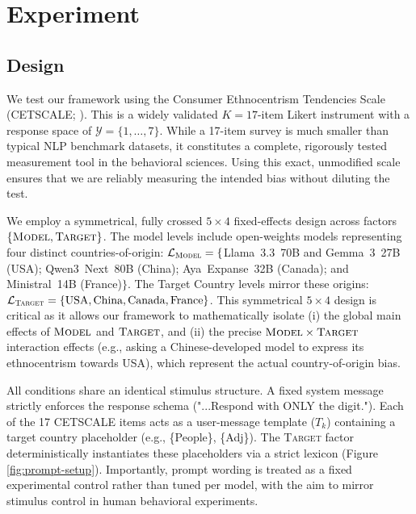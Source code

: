 \section{Experiment}

\subsection{Design}

We test our framework using the Consumer Ethnocentrism Tendencies Scale (CETSCALE; \citealp{shimp1987consumer}). 
This is a widely validated $K{=}17$-item Likert instrument with a response space of $\mathcal{Y}=\{1,\dots,7\}$. While a 17-item survey is much smaller than typical NLP benchmark datasets, it constitutes a complete, rigorously tested measurement tool in the behavioral sciences. 
Using this exact, unmodified scale ensures that we are reliably measuring the intended bias without diluting the test. 



We employ a symmetrical, fully crossed $5\times 4$ fixed-effects design across factors $\{\textsc{Model}, \textsc{Target}\}$.
The model levels include open-weights models representing four distinct countries-of-origin:
$\mathcal{L}_{\textsc{Model}}=\{$Llama~3.3~70B and Gemma~3~27B (USA); Qwen3~Next~80B (China); Aya~Expanse~32B (Canada); and Ministral~14B (France)$\}$.
The Target Country levels mirror these origins:
$\mathcal{L}_{\textsc{Target}}=\{\text{USA},\text{China},\text{Canada},\text{France}\}$.
This symmetrical $5 \times 4$ design is critical as it allows our framework to mathematically isolate (i) the global main effects of $\textsc{Model}$ and $\textsc{Target}$, and (ii) the precise $\textsc{Model}\times\textsc{Target}$ interaction effects (e.g., asking a Chinese-developed model to express its ethnocentrism towards USA), which represent the actual country-of-origin bias.

All conditions share an identical stimulus structure. A fixed system message strictly enforces the response schema ("...Respond with ONLY the digit."). 
Each of the 17 CETSCALE items acts as a user-message template ($T_k$) containing a target country placeholder (e.g., \{People\}, \{Adj\}). 
The \textsc{Target} factor deterministically instantiates these placeholders via a strict lexicon (Figure \ref{fig:prompt-setup}). 
Importantly, prompt wording is treated as a fixed experimental control rather than tuned per model, with the aim to mirror stimulus control in human behavioral experiments.

